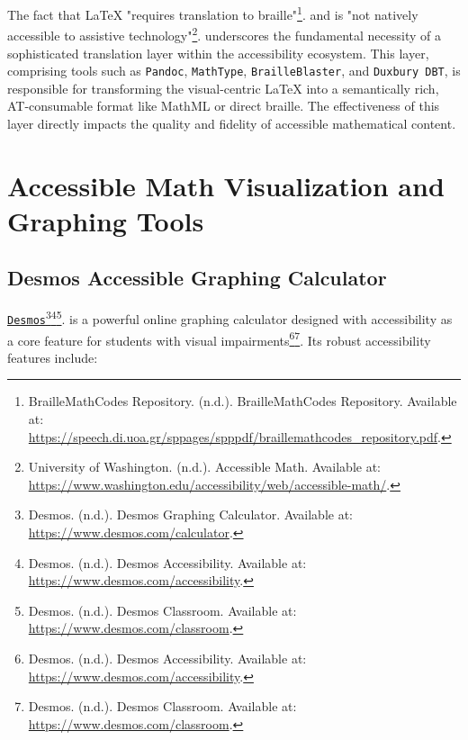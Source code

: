 The fact that LaTeX "requires translation to braille"\footnote{BrailleMathCodes Repository. (n.d.). BrailleMathCodes Repository. Available at: \url{https://speech.di.uoa.gr/sppages/spppdf/braillemathcodes_repository.pdf}.}. and is "not natively accessible to assistive technology"\footnote{University of Washington. (n.d.). Accessible Math. Available at: \url{https://www.washington.edu/accessibility/web/accessible-math/}.}. underscores the fundamental necessity of a sophisticated translation layer within the accessibility ecosystem. This layer, comprising tools such as \texttt{Pandoc}, \texttt{MathType}, \texttt{BrailleBlaster}, and \texttt{Duxbury DBT}, is responsible for transforming the visual-centric LaTeX into a semantically rich, AT-consumable format like MathML or direct braille. The effectiveness of this layer directly impacts the quality and fidelity of accessible mathematical content.

\section{Accessible Math Visualization and Graphing Tools}\label{sec:math-visualization}
\subsection{Desmos Accessible Graphing Calculator}
\href{https://www.desmos.com/}{\texttt{Desmos}}\footnote{Desmos. (n.d.). Desmos Graphing Calculator. Available at: \url{https://www.desmos.com/calculator}.}\footnote{Desmos. (n.d.). Desmos Accessibility. Available at: \url{https://www.desmos.com/accessibility}.}\footnote{Desmos. (n.d.). Desmos Classroom. Available at: \url{https://www.desmos.com/classroom}.}. is a powerful online graphing calculator designed with accessibility as a core feature for students with visual impairments\footnote{Desmos. (n.d.). Desmos Accessibility. Available at: \url{https://www.desmos.com/accessibility}.}\footnote{Desmos. (n.d.). Desmos Classroom. Available at: \url{https://www.desmos.com/classroom}.}. Its robust accessibility features include:


